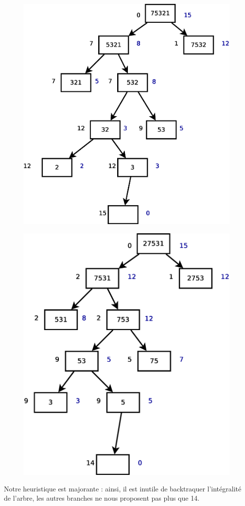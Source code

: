 \documentclass[12pt,a4paper,openany]{book}
\begin{document}
	\begin{figure}[H]
		\centering
		\includegraphics[width=12cm]{Diagramme6.eps} 
	\end{figure}
	\begin{figure}[H]
		\centering
		\includegraphics[width=12cm]{Diagramme7.eps} 
	\end{figure}
	Notre heuristique est majorante : ainsi, il est inutile de backtraquer l'intégralité de l'arbre, les autres branches ne nous proposent pas plus
	que 14.
\end{document}
